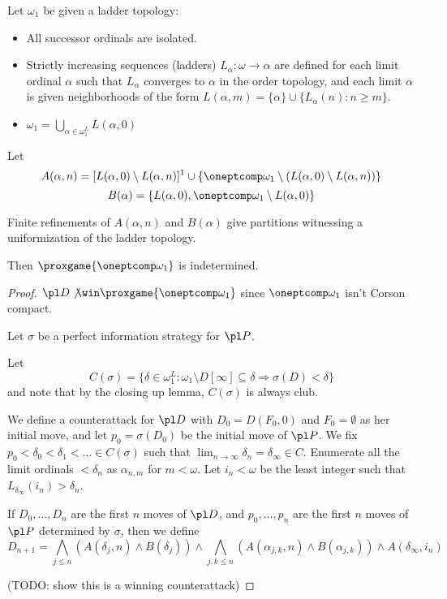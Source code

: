 \begin{ex}
  Let $\omega_1$ be given a ladder topology:
    \begin{itemize}
      \item All successor ordinals are isolated.
      \item Strictly increasing sequences (ladders) $L_\alpha:\omega\to\alpha$ 
            are defined for each limit ordinal $\alpha$ such that $L_\alpha$ converges to $\alpha$ in the order topology, and each limit
            $\alpha$ is given neighborhoods of the form
            $L(\alpha,m)=\{\alpha\}\cup\{L_\alpha(n):n\geq m\}$. 
      \item $\omega_1=\bigcup_{\alpha\in\omega_1^L} L(\alpha,0)$
    \end{itemize} 
  
  Let 
    \[
      A(\alpha,n)
        =
      [L(\alpha,0)\setminus L(\alpha,n)]^1 
        \cup
      \{\oneptcomp\omega_1 \setminus (L(\alpha,0)\setminus L(\alpha,n))\}
    \]
    \[
      B(\alpha)
        =
      \{L(\alpha,0), \oneptcomp\omega_1 \setminus L(\alpha,0)\}
    \]
    
  Finite refinements of $A(\alpha,n)$ and $B(\alpha)$ give partitions
  witnessing a uniformization of the ladder topology.
  
  Then $\proxgame{\oneptcomp\omega_1}$ is indetermined.
\end{ex}

\begin{proof}
  $\pl D\not\win\proxgame{\oneptcomp\omega_1}$ since $\oneptcomp\omega_1$
  isn't Corson compact.

  Let $\sigma$ be a perfect information strategy for $\pl P$.
  
  Let
  \[
    C(\sigma) 
      = 
    \{
      \delta\in\omega_1^L
        : 
      \omega_1\setminus D[\infty] \subseteq \delta
        \Rightarrow
      \sigma(D) < \delta
    \}
  \]
  and note that by the closing up lemma, $C(\sigma)$ is always club.
  
  We define a counterattack for $\pl D$ with $D_0=D(F_0,0)$ and
  $F_0=\emptyset$ as her 
  initial move, and let $p_0=\sigma(D_0)$ be the initial move of $\pl P$. 
  We fix $p_0<\delta_0<\delta_1<\dots\in C(\sigma)$ such that 
  $\lim_{n\to\infty}\delta_n=\delta_\infty\in C$. Enumerate all the
  limit ordinals $<\delta_n$ as $\alpha_{n,m}$ for $m<\omega$. Let
  $i_n<\omega$ be the least integer such that 
  $L_{\delta_\infty}(i_n)>\delta_n$.
  
  If $D_0,\dots,D_n$ are the first $n$ moves of $\pl D$, and 
  $p_0,\dots,p_n$ are the first $n$ moves of $\pl P$ determined by $\sigma$,
  then we define
    \[
      D_{n+1} 
        =
      \bigwedge_{j\leq n}
      \left(
        A(\delta_j,n)
          \wedge
        B(\delta_j)
      \right)
        \wedge
      \bigwedge_{j,k\leq n}
      \left(
        A(\alpha_{j,k},n)
          \wedge
        B(\alpha_{j,k})
      \right)
        \wedge
      A(\delta_\infty,i_n)
    \]
  
  (TODO: show this is a winning counterattack)
\end{proof}
